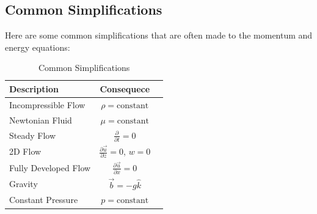\subsection{Common Simplifications}
Here are some common simplifications that are often made to the momentum and energy equations:
\begin{table}[H]
    \centering
    \caption{Common Simplifications}
    \begin{tabular}{p{}cc}
        \toprule
        Description & Consequece \\
        \midrule
        Incompressible Flow & $\rho = \text{constant}$ \\
        Newtonian Fluid & $\mu = \text{constant}$ \\
        Steady Flow & $\frac{\partial}{\partial t} = 0$ \\
        2D Flow & $\frac{\partial \vec{u}}{\partial z} = 0$, $w = 0$ \\
        Fully Developed Flow & $\frac{\partial \vec{u}}{\partial x} = 0$ \\
        Gravity & $\vec{b} = -g \hat{k}$ \\
        Constant Pressure & $p = \text{constant}$ \\
        \bottomrule
    \end{tabular}
\end{table}